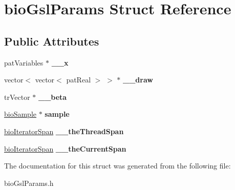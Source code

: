 \hypertarget{structbio_gsl_params}{}\section{bio\+Gsl\+Params Struct Reference}
\label{structbio_gsl_params}
\subsection*{Public Attributes}
\begin{DoxyCompactItemize}
\item 
\mbox{\label{structbio_gsl_params_aa045bb152793ac4e620b7fa93d97b0a2}} 
pat\+Variables $\ast$ {\bfseries \+\_\+\+\_\+x}
\item 
\mbox{\label{structbio_gsl_params_affc934bff25698597363f559829d59f1}} 
vector$<$ vector$<$ pat\+Real $>$ $>$ $\ast$ {\bfseries \+\_\+\+\_\+draw}
\item 
\mbox{\label{structbio_gsl_params_a1dcb29b5ae4bc637f21e7f027832e458}} 
tr\+Vector $\ast$ {\bfseries \+\_\+\+\_\+beta}
\item 
\mbox{\label{structbio_gsl_params_a136e6ba4512d5e80d2ae7d7a03d8d4c0}} 
\hyperlink{classbio_sample}{bio\+Sample} $\ast$ {\bfseries sample}
\item 
\mbox{\label{structbio_gsl_params_a8824f6241400c5fa31194b045e68a339}} 
\hyperlink{classbio_iterator_span}{bio\+Iterator\+Span} {\bfseries \+\_\+\+\_\+the\+Thread\+Span}
\item 
\mbox{\label{structbio_gsl_params_a3875935a881054f5198f20ff8bfd7603}} 
\hyperlink{classbio_iterator_span}{bio\+Iterator\+Span} {\bfseries \+\_\+\+\_\+the\+Current\+Span}
\end{DoxyCompactItemize}


The documentation for this struct was generated from the following file\+:\begin{DoxyCompactItemize}
\item 
bio\+Gsl\+Params.\+h\end{DoxyCompactItemize}
